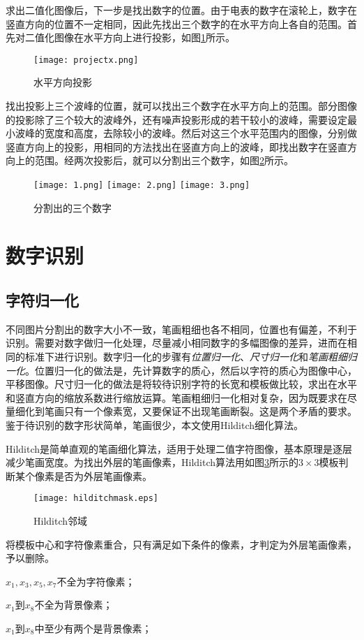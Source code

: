 求出二值化图像后，下一步是找出数字的位置。由于电表的数字在滚轮上，数字在竖直方向的位置不一定相同，因此先找出三个数字的在水平方向上各自的范围。首先对二值化图像在水平方向上进行投影，如图\ref{fig:projectx}所示。
\begin{figure}[h]
  \centering
  \texttt{[image: projectx.png]}
  \caption{水平方向投影}
  \label{fig:projectx}
\end{figure}
找出投影上三个波峰的位置，就可以找出三个数字在水平方向上的范围。部分图像的投影除了三个较大的波峰外，还有噪声投影形成的若干较小的波峰，需要设定最小波峰的宽度和高度，去除较小的波峰。然后对这三个水平范围内的图像，分别做竖直方向上的投影，用相同的方法找出在竖直方向上的波峰，即找出数字在竖直方向上的范围。经两次投影后，就可以分割出三个数字，如图\ref{fig:digit}所示。
\begin{figure}[h]
  \centering
  \texttt{[image: 1.png]}\hspace{1cm}
  \texttt{[image: 2.png]}\hspace{1cm}
  \texttt{[image: 3.png]}
  \caption{分割出的三个数字}
  \label{fig:digit}
\end{figure}

\section{数字识别}

\subsection{字符归一化}

不同图片分割出的数字大小不一致，笔画粗细也各不相同，位置也有偏差，不利于识别。需要对数字做归一化处理，尽量减小相同数字的多幅图像的差异，进而在相同的标准下进行识别。数字归一化的步骤有\emph{位置归一化}、\emph{尺寸归一化}和\emph{笔画粗细归一化}。位置归一化的做法是，先计算数字的质心，然后以字符的质心为图像中心，平移图像。尺寸归一化的做法是将较待识别字符的长宽和模板做比较，求出在水平和竖直方向的缩放系数进行缩放运算。笔画粗细归一化相对复杂，因为既要求在尽量细化到笔画只有一个像素宽，又要保证不出现笔画断裂。这是两个矛盾的要求。鉴于待识别的数字形状简单，笔画很少，本文使用Hilditch细化算法。

Hilditch是简单直观的笔画细化算法，适用于处理二值字符图像，基本原理是逐层减少笔画宽度。为找出外层的笔画像素，Hilditch算法用如图\ref{fig:hilditchmask}所示的$3\times 3$模板判断某个像素是否为外层笔画像素。
\begin{figure}[h]
  \centering
  \texttt{[image: hilditchmask.eps]}
  \caption{Hilditch邻域}
  \label{fig:hilditchmask}
\end{figure}
将模板中心和字符像素重合，只有满足如下条件的像素，才判定为外层笔画像素，予以删除。
\begin{asparaenum}[(1)]

\item $x_1,x_3,x_5,x_7$不全为字符像素；
\item $x_1$到$x_8$不全为背景像素；
\item $x_1$到$x_8$中至少有两个是背景像素；
\end{asparaenum}

